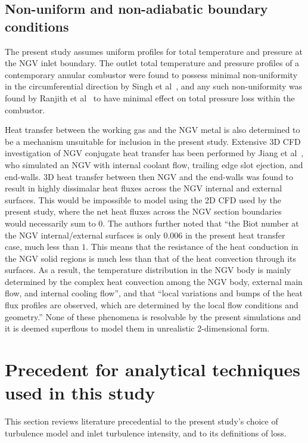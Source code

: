 \documentclass[a4paper, 11pt, oneside]{report}
\begin{document}
\subsection{Non-uniform and non-adiabatic boundary conditions}

The present study assumes uniform profiles for total temperature and pressure at the NGV inlet boundary. The outlet total temperature and pressure profiles of a contemporary annular combustor were found to possess minimal non-uniformity in the circumferential direction by Singh et al~\cite{singh_annular_combustors}, and any such non-uniformity was found by Ranjith et al~\cite{ranjith_annular_combustors} to have minimal effect on total pressure loss within the combustor. 

Heat transfer between the working gas and the NGV metal is also determined to be a mechanism unsuitable for inclusion in the present study. Extensive 3D CFD investigation of NGV conjugate heat transfer has been performed by Jiang et al~\cite{jiang_heat_transfer}, who simulated an NGV with internal coolant flow, trailing edge slot ejection, and end-walls. 3D heat transfer between then NGV and the end-walls was found to result in highly dissimalar heat fluxes across the NGV internal and external surfaces. This would be impossible to model using the 2D CFD used by the present study, where the net heat fluxes across the NGV section boundaries would necessarily sum to $0$. The authors further noted that ``the Biot number at the NGV internal/external surfaces is only $0.006$ in the present heat transfer case, much less than $1$. This means that the resistance of the heat conduction in the NGV solid regions is much less than that of the heat convection through its surfaces. As a result, the temperature distribution in the NGV body is mainly determined by the complex heat convection among the NGV body, external main flow, and internal cooling flow'', and that ``local variations and bumps of the heat flux profiles are observed, which are determined by the local flow conditions and geometry.'' None of these phenomena is resolvable by the present simulations and it is deemed superflous to model them in unrealistic 2-dimensional form.

\section{Precedent for analytical techniques used in this study}
\label{precedent_for_analytical_techniques_used_in_this_study}

This section reviews literature precedential to the present study's choice of turbulence model and inlet turbulence intensity, and to its definitions of loss.
\end{document}
